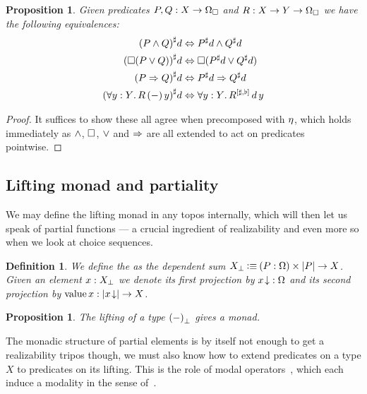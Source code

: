 \documentclass[11pt]{article}
\newtheorem{prop}[thrm]{Proposition}
\newtheorem{defn}[thrm]{Definition}
\begin{document}
\begin{prop}\label{prop:heyting-structure-predicate-extension}
  Given predicates \(P,Q : X \to \Omega_\Box\) and \(R : X \to Y \to \Omega_\Box\) we
  have the following equivalences:
  \begin{align*}
    {({P}\land{Q})}^\sharp d
    &\Leftrightarrow
      {{P}^\sharp d}\land{{Q}^\sharp d}
    \\
    {(\Box{({P}\lor{Q})})}^\sharp d
    &\Leftrightarrow
      \Box{({{P}^\sharp d}\lor{{Q}^\sharp d})}
    \\
    {({P}\Rightarrow{Q})}^\sharp d
    &\Leftrightarrow
      {{P}^\sharp d}\Rightarrow{{Q}^\sharp d}
    \\
    {(\forall{y:Y}.\,{R\,(-)\,y})}^\sharp d
    &\Leftrightarrow
      \forall{y:Y}.\,{{R}^{[{\sharp,\flat}]}\,d\,y}
  \end{align*}
\end{prop}
\begin{proof}
  It suffices to show these all agree when precomposed with \(\eta\), which
  holds immediately as \(\land\), \(\Box\), \(\lor\) and
  \(\Rightarrow\) are all extended to act on predicates pointwise.
\end{proof}

\subsection{Lifting monad and partiality}

We may define the lifting monad in any topos internally, which will then
let us speak of partial functions --- a crucial ingredient of realizability
and even more so when we look at choice sequences.

\begin{defn}\label{defn:lifting}
  We define the  as the dependent sum
  \({X}_\bot \mathbin{\vcentcolon\equiv} {(P : \Omega)}\times{|{P}|\to X}\).
  Given an element \(x : {X}_\bot\) we denote its first projection by
  \({{x}\!\downarrow} : \Omega\) and its second projection by
  \(\text{value}\,{x}: |{{{x}\!\downarrow}}| \to X\).
\end{defn}

\begin{prop}
  The lifting of a type \({(-)}_\bot\) gives a monad.
\end{prop}

The monadic structure of partial elements is by itself not enough to get
a realizability tripos though, we must also know how to extend predicates on
a type \(X\) to predicates on its lifting.
%
This is the role of modal operators~\cite{moggiNotionsComputationMonads1991},
which each induce a modality in the sense
of~\cite{cohenPartialMonadicCombinatory2025}.
\end{document}
